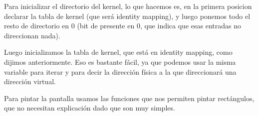 \par Para inicializar el directorio del kernel, lo que hacemos es, en la primera posicion declarar la tabla de kernel (que será identity mapping), y luego ponemos todo el resto de directorio en 0 (bit de presente en 0, que indica que esas entradas no direccionan nada).

\par Luego inicializamos la tabla de kernel, que está en identity mapping, como dijimos anteriormente. Eso es bastante fácil, ya que podemos usar la misma variable para iterar y para decir la dirección física a la que direccionará una dirección virtual.


\par Para pintar la pantalla usamos las funciones que nos permiten pintar rectángulos, que no necesitan explicación dado que son muy simples.